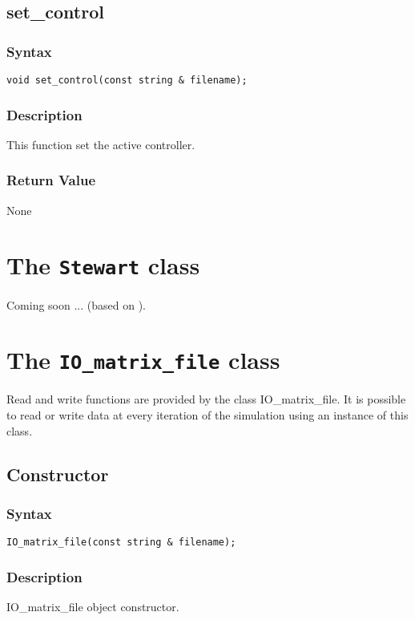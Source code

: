 \documentclass[dvips,11pt,fleqn]{report}
\begin{document}
\subsection*{set\_control}
\subsubsection*{Syntax}
\begin{verbatim}
void set_control(const string & filename);
\end{verbatim}

\subsubsection*{Description}   
This function set the active controller.
\subsubsection*{Return Value}

None

\newpage

\section{The \texttt{Stewart} class}

Coming soon ... (based on \cite{Harib03}).

\newpage

\section{The \texttt{IO\_matrix\_file} class}

Read and write functions are provided by the class IO\_matrix\_file.
It is possible to read or write data at every iteration of the
simulation using an instance of this class.

\subsection*{Constructor}
\subsubsection*{Syntax}
\begin{verbatim}
IO_matrix_file(const string & filename);
\end{verbatim}

\subsubsection*{Description}   
IO\_matrix\_file object constructor.
\end{document}
